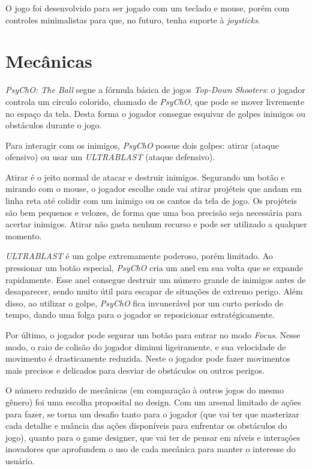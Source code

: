 O jogo foi desenvolvido para ser jogado com um teclado e mouse, porém com controles minimalistas para que, no futuro, tenha suporte à \textit{joysticks}.

\section{Mecânicas}
\label{sec:mecanicas}

\textit{PsyChO: The Ball} segue a fórmula básica de jogos \textit{Top-Down Shooters}: o jogador controla um círculo colorido, chamado de \textit{PsyChO},
que pode se mover livremente no espaço da tela. Desta forma o jogador consegue esquivar de golpes inimigos ou obstáculos durante o jogo.

Para interagir com os inimigos, \textit{PsyChO} possue dois golpes: atirar (ataque ofensivo) ou usar um \textit{ULTRABLAST} (ataque defensivo).

Atirar é o jeito normal de atacar e destruir inimigos. Segurando um botão e mirando com o mouse, o jogador escolhe onde vai atirar projéteis que andam em
linha reta até colidir com um inimigo ou os cantos da tela de jogo. Os projéteis são bem pequenos e velozes, de forma que uma boa precisão seja necessária para
acertar inimigos. Atirar não gasta nenhum recurso e pode ser utilizado a qualquer momento.

\textit{ULTRABLAST} é um golpe extremamente poderoso, porém limitado. Ao pressionar um botão especial, \textit{PsyChO} cria um anel
em sua volta que se expande rapidamente. Esse anel consegue destruir um número grande de inimigos antes de desaparecer, sendo muito útil para escapar de situações
de extremo perigo. Além disso, ao utilizar o golpe, \textit{PsyChO} fica invunerável por um curto período de tempo, dando uma folga para o jogador
se reposicionar estratégicamente.

Por último, o jogador pode segurar um botão para entrar no modo \textit{Focus}. Nesse modo, o raio de colisão do jogador diminui ligeiramente, e sua velocidade de
movimento é drasticamente reduzida. Neste o jogador pode fazer movimentos mais precisos e delicados para desviar de obstáculos ou outros perigos.

O número reduzido de mecânicas (em comparação à outros jogos do mesmo gênero) foi uma escolha proposital no design. Com um arsenal limitado de ações para fazer,
se torna um desafio tanto para o jogador (que vai ter que masterizar cada detalhe e nuância das ações disponíveis para enfrentar os obstáculos do jogo), quanto para o game designer,
que vai ter de pensar em níveis e interações inovadores que aprofundem o uso de cada mecânica para manter o interesse do usuário.

